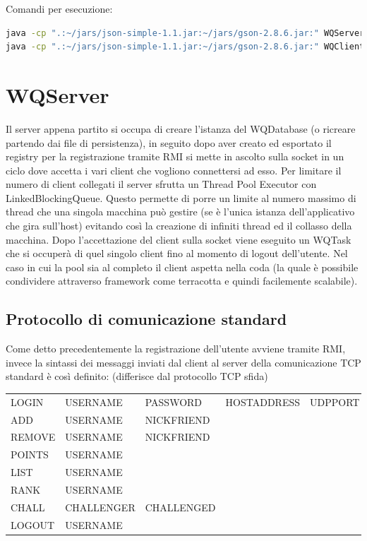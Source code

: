 \documentclass{article}
\begin{document}
Comandi per esecuzione:
\begin{lstlisting}[language=bash]
java -cp ".:~/jars/json-simple-1.1.jar:~/jars/gson-2.8.6.jar:" WQServer
java -cp ".:~/jars/json-simple-1.1.jar:~/jars/gson-2.8.6.jar:" WQClient
\end{lstlisting}
\clearpage

\section{WQServer}
Il server appena partito si occupa di creare l'istanza del WQDatabase (o ricreare partendo dai file di persistenza), in seguito dopo aver creato ed esportato il registry per la registrazione tramite RMI si mette in ascolto sulla socket in un ciclo dove accetta i vari client che vogliono connettersi ad esso. Per limitare il numero di client collegati il server sfrutta un Thread Pool Executor con LinkedBlockingQueue. Questo permette di porre un limite al numero massimo di thread che una singola macchina può gestire (se è l'unica istanza dell'applicativo che gira sull'host) evitando così la creazione di infiniti thread ed il collasso della macchina. Dopo l'accettazione del client sulla socket viene eseguito un WQTask che si occuperà di quel singolo client fino al momento di logout dell'utente. Nel caso in cui la pool sia al completo il client aspetta nella coda (la quale è possibile condividere attraverso framework come terracotta e quindi facilemente scalabile).

\subsection{Protocollo di comunicazione standard}
Come detto precedentemente la registrazione dell'utente avviene tramite RMI, invece la sintassi dei messaggi inviati dal client al server della comunicazione TCP standard è così definito: (differisce dal protocollo TCP sfida)

\begin{table}[h]
\centering
\begin{tabular}{l|l|l|l|l}
LOGIN  & USERNAME   & PASSWORD   & HOSTADDRESS & UDPPORT  \\
ADD    & USERNAME   & NICKFRIEND &             &          \\
REMOVE & USERNAME   & NICKFRIEND &             &          \\
POINTS & USERNAME   &            &             &          \\
LIST   & USERNAME   &            &             &          \\
RANK   & USERNAME   &            &             &          \\
CHALL  & CHALLENGER & CHALLENGED &             &          \\
LOGOUT & USERNAME   &            &             &         
\end{tabular}
\end{table}
\end{document}
